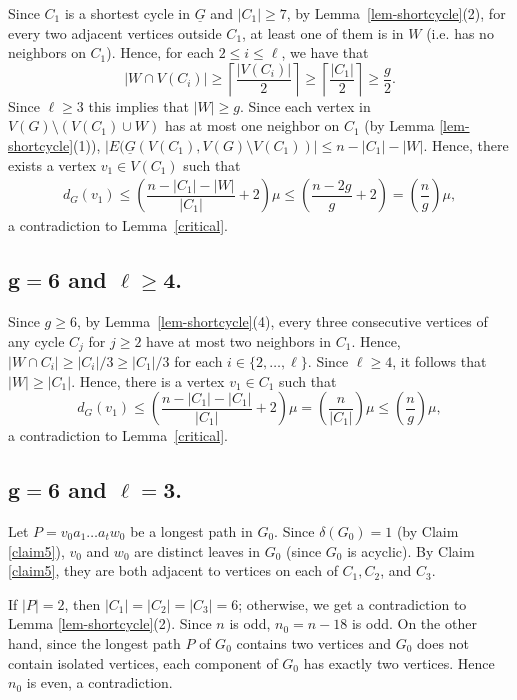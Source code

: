 \documentclass[12pt,oneside]{amsart}
\newcommand\roundup[1]{\left\lceil#1\right\rceil}
\begin{document}
Since $C_1$ is a shortest cycle in $\underline{G}$ and $|C_1| \ge 7$,  by Lemma~\ref{lem-shortcycle}(2), for every two adjacent vertices outside $C_1$, at least one of them is in $W$ (i.e. has no neighbors on $C_1$).  Hence, for each $2\le i \le \ell$, we have that
\[|W\cap V(C_i)| \ge \roundup{\frac{|V(C_i)|}{2}} \ge \roundup{\frac{|C_1|}{2}}\ge \frac{g}{2}.\] Since $\ell\ge 3$ this implies that $|W| \ge g$. Since each vertex in $V(G)\setminus (V(C_1)\cup W)$ has at most one neighbor on $C_1$ (by Lemma \ref{lem-shortcycle}(1)),
$|E(\underline{G}(V(C_1), V(G)\setminus V(C_1))| \le n -|C_1| - |W|$.
Hence, there exists a vertex $v_1\in V(C_1)$ such that
\begin{align*}
    d_{G}(v_1)\leq \left(\dfrac{n-|C_1|-|W|}{|C_1|}+2\right)\mu\leq  \left(\dfrac{n-2g}{g}+2\right)= \left(\dfrac{n}{g}\right)\mu,
\end{align*}
a contradiction to Lemma~\ref{critical}.

\subsection{\texorpdfstring{${\mathbf{g= 6}}$}{g=6} and \texorpdfstring{$\mathbf{\ell\geq 4}$}{lgeq4}.}

Since $g\geq 6$, by Lemma~\ref{lem-shortcycle}(4),  every three consecutive vertices of any cycle $C_j$ for $j\geq 2$ have at most two neighbors in \( C_1 \). Hence, $|W\cap C_i| \ge |C_i|/3 \ge |C_1|/3 $ for each $i\in \{2, \dots, \ell\}$. Since $\ell\geq 4$, it follows that $|W|  \ge  |C_1|$. Hence, there is a vertex $v_1\in C_1$ such that
$$d_{G}(v_1)\leq \left(\frac{n-|C_1|-|C_1|}{|C_1|}+2\right)\mu=\left(\frac{n}{|C_1|}\right)\mu\le \left(\frac{n}{g}\right)\mu,$$
a contradiction to Lemma~\ref{critical}.


\subsection{\texorpdfstring{${\mathbf{g= 6}}$}{g=6} and \texorpdfstring{$\mathbf{\ell=3}$}{l=3}.}
Let $P=v_0a_1\ldots a_tw_0$ be a longest path in $G_0$. Since $\delta(G_0)=1$ (by Claim \ref{claim5}), $v_0$ and $w_0$ are distinct leaves in $G_0$ (since $G_0$ is acyclic). By Claim \ref{claim5},  they are both adjacent to vertices on each of $C_1, C_2$, and $C_3$.

If $|P|=2$, then $|C_1|=|C_2|=|C_3|=6$; otherwise, we get a contradiction to Lemma \ref{lem-shortcycle}(2). Since $n$ is odd,   $n_0 = n -18$ is odd.  On the other hand,  since the longest path $P$ of $G_0$ contains two vertices and $G_0$ does not contain isolated vertices, each component of $G_0$ has exactly two vertices.  Hence $n_0$ is even, a contradiction.
\end{document}
